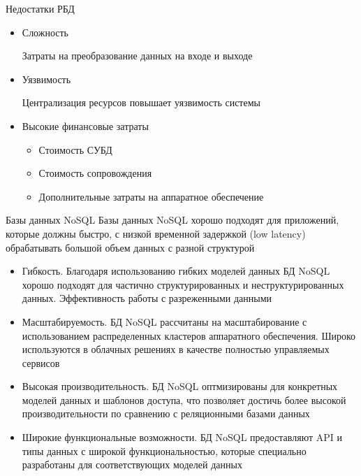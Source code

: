 \documentclass[12pt]{article}
\begin{document}
\begin{nota}{Недостатки РБД}
    \begin{itemize}
        \item Сложность
        
        Затраты на преобразование данных на входе и выходе

        \item Уязвимость
        
        Централизация ресурсов повышает уязвимость системы 

        \item Высокие финансовые затраты 
        
        \begin{itemize}
            \item Стоимость СУБД 
            \item Стоимость сопровождения 
            \item Дополнительные затраты на аппаратное обеспечение 
        \end{itemize}
    \end{itemize}
\end{nota}

\begin{defin}{Базы данных NoSQL}
    Базы данных NoSQL хорошо подходят для приложений, которые должны быстро, с низкой временной задержкой (low latency) обрабатывать большой объем данных с разной структурой 

    \begin{itemize}
        \item Гибкость. Благодаря использованию гибких моделей данных БД NoSQL хорошо подходят для частично структурированных и неструктурированных данных. Эффективность работы с разреженными данными 
        \item Масштабируемость. БД NoSQL рассчитаны на масштабирование с использованием распределенных кластеров аппаратного обеспечения. Широко используются в облачных решениях в качестве полностью управляемых сервисов
        \item Высокая производительность. БД NoSQL оптмизированы для конкретных моделей данных и шаблонов доступа, что позволяет достичь более высокой производительности по сравнению с реляционными базами данных 
        \item Широкие функциональные возможности. БД NoSQL предоставляют API и типы данных с широкой функциональностью, которые специально разработаны для соответствующих моделей данных 
    \end{itemize}
\end{defin}
\end{document}
